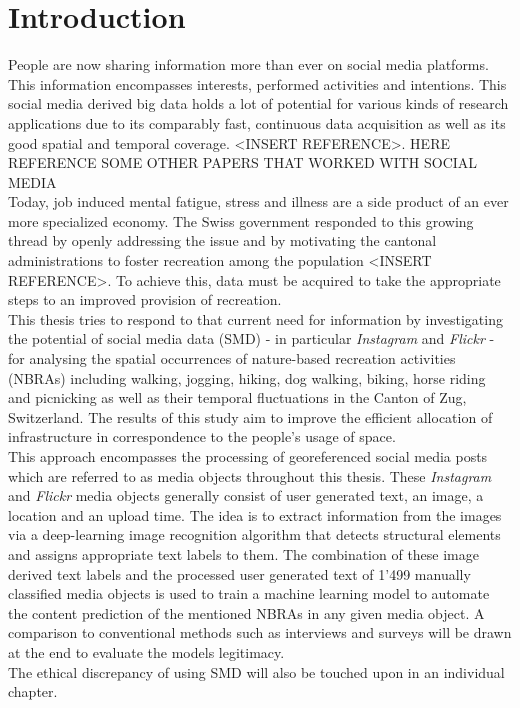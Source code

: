 \chapter{Introduction}
People are now sharing information more than ever on social media platforms. This information encompasses interests, performed activities and intentions. This social media derived big data holds a lot of potential for various kinds of research applications due to its comparably fast, continuous data acquisition as well as its good spatial and temporal coverage. <INSERT REFERENCE>. HERE REFERENCE SOME OTHER PAPERS THAT WORKED WITH SOCIAL MEDIA \\
\newline
Today, job induced mental fatigue, stress and illness are a side product of an ever more specialized economy. The Swiss government responded to this growing thread by openly addressing the issue and by motivating the cantonal administrations to foster recreation among the population <INSERT REFERENCE>. To achieve this, data must be acquired to take the appropriate steps to an improved provision of recreation.\\
This thesis tries to respond to that current need for information by investigating the potential of social media data (SMD) - in particular \textit{Instagram} and \textit{Flickr} - for analysing the spatial occurrences of nature-based recreation activities (NBRAs) including walking, jogging, hiking, dog walking, biking, horse riding and picnicking as well as their temporal fluctuations in the Canton of Zug, Switzerland. The results of this study aim to improve the efficient allocation of infrastructure in correspondence to the people’s usage of space. \\
\newline
This approach encompasses the processing of georeferenced social media posts which are referred to as media objects throughout this thesis. These \textit{Instagram} and \textit{Flickr} media objects generally consist of user generated text, an image, a location and an upload time. The idea is to extract information from the images via a deep-learning image recognition algorithm that detects structural elements and assigns appropriate text labels to them. The combination of these image derived text labels and the processed user generated text of 1\rq499 manually classified media objects is used to train a machine learning model to automate the content prediction of the mentioned NBRAs in any given media object. A comparison to conventional methods such as interviews and surveys will be drawn at the end to evaluate the models legitimacy. \\
The ethical discrepancy of using SMD will also be touched upon in an individual chapter.